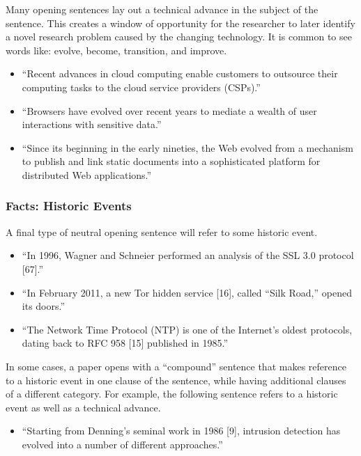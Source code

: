 \documentclass[sigconf]{acmart}
\begin{document}
	Many opening sentences lay out a technical advance in the subject of the sentence. This creates a window of opportunity for the researcher to later identify a novel research problem caused by the changing technology.  It is common to see words like: evolve, become, transition, and improve.
	\begin{itemize}
		\item	``Recent advances in cloud computing enable customers to outsource their computing tasks to the cloud service providers (CSPs).''~\cite{pattuk2014preventing}

		\item	``Browsers have evolved over recent years to mediate a wealth of user interactions with sensitive data.''~\cite{jagpal2015trends}

		\item	``Since its beginning in the early nineties, the Web evolved from a mechanism to publish and link static documents into a sophisticated platform for distributed Web applications.''~\cite{lekies2015unexpected}
	\end{itemize}
	\subsubsection{Facts: Historic Events}

	A final type of neutral opening sentence will refer to some historic event.
	\begin{itemize}
		\item	``In 1996, Wagner and Schneier performed an analysis of the SSL 3.0 protocol [67].''~\cite{van2016request}

		\item	``In February 2011, a new Tor hidden service [16], called “Silk Road,” opened its doors.''~\cite{soska2015measuring}

		\item	``The Network Time Protocol (NTP) is one of the Internet’s oldest protocols, dating back to RFC 958 [15] published in 1985.''~\cite{dowling2016authenticated}
	\end{itemize}
	In some cases, a paper opens with a “compound” sentence that makes reference to a historic event in one clause of the sentence, while having additional clauses of a different category. For example, the following sentence refers to a historic event as well as a technical advance.

	\begin{itemize}
		\item 	``Starting from Denning’s seminal work in 1986 [9], intrusion detection has evolved into a number of different approaches.''~\cite{caselli2016specification}
	\end{itemize}
\end{document}
